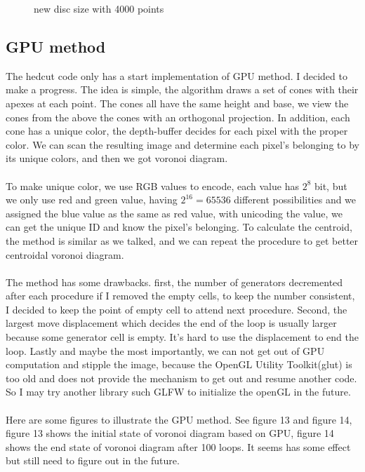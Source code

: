 \documentclass[11pt]{article}
\begin{document}
\begin{figure}[htbp]
\begin{minipage}[t]{0.48\textwidth}
\caption{new disc size with 4000 points}
\end{minipage}
\end{figure}





\subsection{GPU method}
The hedcut code only has a start implementation of GPU method. I decided to make a progress. The idea is simple, the algorithm\cite{hoff1999fast} draws a set of cones with their apexes at each point. The cones all have the same height and base, we view the cones from the above the cones with an orthogonal projection. In addition, each cone has a unique color, the depth-buffer decides for each pixel with the proper color. We can scan the resulting image and determine each pixel's belonging to by its unique colors, and then we got voronoi diagram.
\\\\To make unique color, we use RGB values to encode, each value has $2^8$ bit, but we only use red and green value, having $2^16 = 65536$ different possibilities and we assigned the blue value as the same as red value, with unicoding the value, we can get the unique ID and know the pixel's belonging. To calculate the centroid, the method is similar as we talked, and we can repeat the procedure to get better centroidal voronoi diagram.
\\\\The method has some drawbacks. first, the number of generators decremented after each procedure if I removed the empty cells, to keep the number consistent, I decided to keep the point of empty cell to attend next procedure. Second, the largest move displacement which decides the end of the loop is usually larger because some generator cell is empty. It's hard to use the displacement to end the loop. Lastly and maybe the most importantly, we can not get out of GPU computation and stipple the image, because the OpenGL Utility Toolkit(glut) is too old and does not provide the mechanism to get out and resume another code. So I may try another library such GLFW to initialize the openGL in the future.
\\\\Here are some figures to illustrate the GPU method. See figure 13 and figure 14, figure 13 shows the initial state of voronoi diagram based on GPU, figure 14 shows the end state of voronoi diagram after 100 loops. It seems has some effect but still need to figure out in the future.
\end{document}
